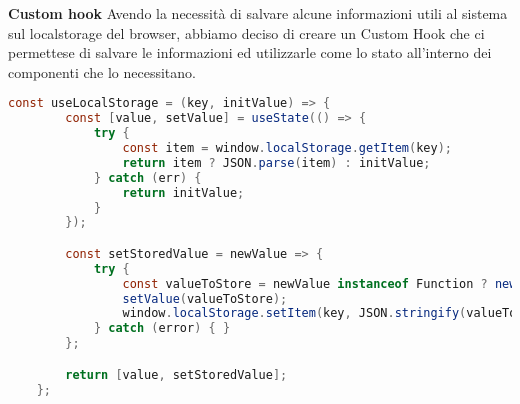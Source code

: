 \bigbreak
\noindent
\textbf{Custom hook}
\bigbreak
\noindent
Avendo la necessità di salvare alcune informazioni utili al sistema sul localstorage del browser, 
abbiamo deciso di creare un Custom Hook che ci permettese di salvare le informazioni ed utilizzarle come lo stato all'interno dei componenti che lo necessitano.

\begin{lstlisting}[language=java]
	const useLocalStorage = (key, initValue) => {
		const [value, setValue] = useState(() => {
			try {
				const item = window.localStorage.getItem(key);
				return item ? JSON.parse(item) : initValue;
			} catch (err) {
				return initValue;
			}
		});

		const setStoredValue = newValue => {
			try {
				const valueToStore = newValue instanceof Function ? newValue(value) : newValue;
				setValue(valueToStore);
				window.localStorage.setItem(key, JSON.stringify(valueToStore));
			} catch (error) { }
		};

		return [value, setStoredValue];
	};
\end{lstlisting}
